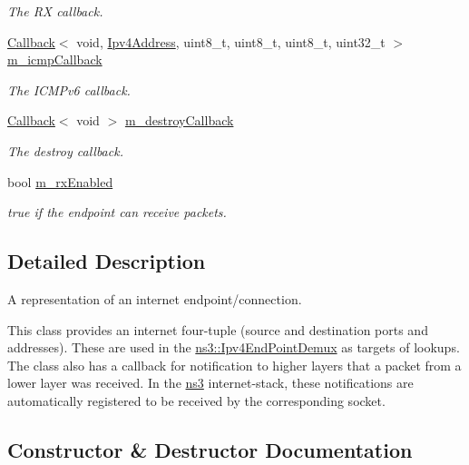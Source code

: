 \begin{DoxyCompactItemize}
\begin{DoxyCompactList}\small\item\em The RX callback. \end{DoxyCompactList}\item 
\hyperlink{classns3_1_1Callback}{Callback}$<$ void, \hyperlink{classns3_1_1Ipv4Address}{Ipv4\+Address}, uint8\+\_\+t, uint8\+\_\+t, uint8\+\_\+t, uint32\+\_\+t $>$ \hyperlink{classns3_1_1Ipv4EndPoint_a422148fb2d2d931558ac69c55d80c01c}{m\+\_\+icmp\+Callback}
\begin{DoxyCompactList}\small\item\em The I\+C\+M\+Pv6 callback. \end{DoxyCompactList}\item 
\hyperlink{classns3_1_1Callback}{Callback}$<$ void $>$ \hyperlink{classns3_1_1Ipv4EndPoint_ad3e21ec6619dfb4e8a9ccfb696c1d020}{m\+\_\+destroy\+Callback}
\begin{DoxyCompactList}\small\item\em The destroy callback. \end{DoxyCompactList}\item 
bool \hyperlink{classns3_1_1Ipv4EndPoint_a0f0079b1a77f91505def1f7000a8c2b1}{m\+\_\+rx\+Enabled}
\begin{DoxyCompactList}\small\item\em true if the endpoint can receive packets. \end{DoxyCompactList}\end{DoxyCompactItemize}


\subsection{Detailed Description}
A representation of an internet endpoint/connection. 

This class provides an internet four-\/tuple (source and destination ports and addresses). These are used in the \hyperlink{classns3_1_1Ipv4EndPointDemux}{ns3\+::\+Ipv4\+End\+Point\+Demux} as targets of lookups. The class also has a callback for notification to higher layers that a packet from a lower layer was received. In the \hyperlink{namespacens3}{ns3} internet-\/stack, these notifications are automatically registered to be received by the corresponding socket. 

\subsection{Constructor \& Destructor Documentation}
